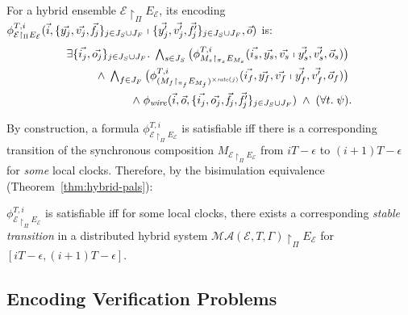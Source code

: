 \begin{definition}
For a hybrid ensemble $\mathcal{E} \restriction_{\Pi} E_\mathcal{E}$, %
its encoding
$\phi_{\mathcal{E} \restriction_{\Pi} E_\mathcal{E}}^{T,i}(
	\vec{i}, \{\vec{y_j}, \vec{v_j},\vec{\mathit{f}_j}\}_{j\in J_S\cup J_F}
	\shortmid 
	\{\vec{y'_j}, \vec{v'_j}, \vec{\mathit{f}_j'}\}_{j\in J_S\cup J_F}, \vec{o})$ is:
\begin{align*}
\exists \{\vec{i_j},\vec{o_j}\}_{j\in J_S\cup J_F}.\;
\textstyle\bigwedge_{s \in J_S}
\big(\phi_{M_s \restriction_{\pi_s} E_{M_s}}^{T,i}(\vec{i_s}, \vec{y_s}, \vec{v_s} \shortmid \vec{y'_s}, \vec{v'_s}, \vec{o}_s)\big)
\phantom{.}
\\
\wedge\;
\textstyle\bigwedge_{f \in J_F}
\big(\phi_{(M_f \restriction_{\pi_f} E_{M_f})^{\times\mathit{rate}(j)}}^{T,i}(\vec{i_f}, \vec{y_f}, \vec{v_f} \shortmid \vec{y'_f}, \vec{v'_f}, \vec{o}_f)\big)
\phantom{.}
\\
\wedge\;
\phi_\mathit{wire}(\vec{i},\vec{o},\{\vec{i_j},\vec{o_j},\vec{\mathit{f}_j},\vec{\mathit{f}_j'}\}_{j\in J_S\cup J_F})
\;\wedge\;
(\forall t.\; \psi).
\end{align*}
\end{definition}

By construction, a formula $\phi_{\mathcal{E} \restriction_{\Pi} E_\mathcal{E}}^{T,i}$ is satisfiable
iff there is a corresponding transition of the synchronous composition $M_{\mathcal{E} \restriction_{\Pi} E_\mathcal{E}}$
from $iT - \epsilon$ to $(i+1)T - \epsilon$ for \emph{some} local clocks.
Therefore, by  the bisimulation equivalence (Theorem~\ref{thm:hybrid-pals}):

\begin{theorem}\label{thm:pals-encoding}
$\phi_{\mathcal{E} \restriction_{\Pi} E_\mathcal{E}}^{T,i}$ is satisfiable 
iff for some local clocks, there exists a corresponding \emph{stable transition} in a distributed hybrid system  
$\mathcal{MA}(\mathcal{E}, T, \Gamma) \restriction_{\Pi} E_\mathcal{E}$   for $[iT - \epsilon,(i+1)T - \epsilon]$.
\end{theorem}

\subsection{Encoding Verification Problems}

